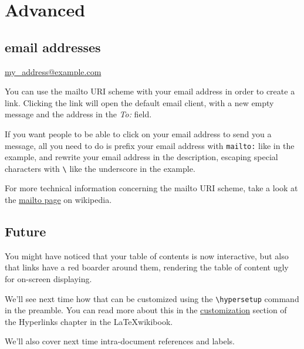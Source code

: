 \documentclass[a4paper]{article}
\begin{document}
\section{Advanced}

\subsection{email addresses}
\href{mailto:my_address@example.com}{my\_address@example.com}

You can use the mailto URI scheme with your email address in order to create
a link. Clicking the link will open the default email client, with a new
empty message and the address in the \textit{To:} field.

If you want people to be able to click on your email address to send you a
message, all you need to do is prefix your email address with \texttt{mailto:}
like in the example, and rewrite your email address in the description,
escaping special characters with \verb`\` like the underscore in the example.

For more technical information concerning the mailto URI scheme, take a look at
the \href{http://en.wikipedia.org/wiki/Mailto}{mailto page} on wikipedia.


\subsection{Future}
You might have noticed that your table of contents is now interactive, but also
that links have a red boarder around them, rendering the table of content
ugly for on-screen displaying.

We'll see next time how that can be customized using the \verb`\hypersetup`
command in the preamble. You can read more about this in the
\href{http://en.wikibooks.org/wiki/LaTeX/Hyperlinks#Customization}
{customization} section of the Hyperlinks chapter in the \LaTeX wikibook.

We'll also cover next time intra-document references and labels.
\end{document}
